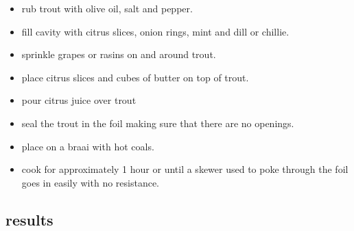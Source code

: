\begin{itemize}
\item rub trout with olive oil, salt and pepper. 
\item fill cavity with citrus slices, onion rings, mint and dill or chillie.
\item sprinkle grapes or rasins on and around trout. 
\item place citrus slices and cubes of butter on top of trout.
\item pour citrus juice over trout
\item seal the trout in the foil making sure that there are no openings. 
\item place on a braai with hot coals. 
\item cook for approximately 1 hour or until a skewer used to poke through the foil goes in easily with no resistance.
\end{itemize}

\subsection*{results}
  
